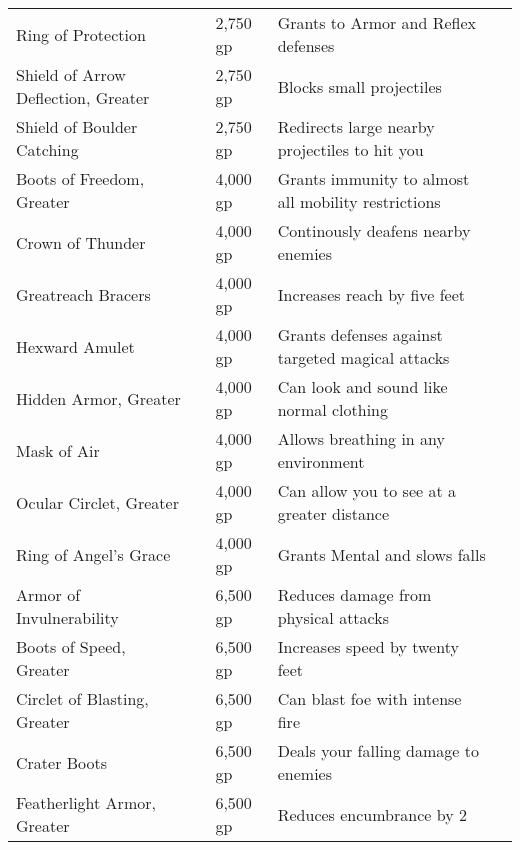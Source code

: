 \begin{longtabuwrapper}
\begin{longtabu}{l l l X l}
Ring of Protection &  & 2,750 gp & Grants  to Armor and Reflex defenses & \pageref{item:Ring of Protection} \\
Shield of Arrow Deflection, Greater &  & 2,750 gp & Blocks small projectiles & \pageref{item:Shield of Arrow Deflection, Greater} \\
Shield of Boulder Catching &  & 2,750 gp & Redirects large nearby projectiles to hit you & \pageref{item:Shield of Boulder Catching} \\
Boots of Freedom, Greater &  & 4,000 gp & Grants immunity to almost all mobility restrictions & \pageref{item:Boots of Freedom, Greater} \\
Crown of Thunder &  & 4,000 gp & Continously deafens nearby enemies & \pageref{item:Crown of Thunder} \\
Greatreach Bracers &  & 4,000 gp & Increases reach by five feet & \pageref{item:Greatreach Bracers} \\
Hexward Amulet &  & 4,000 gp & Grants  defenses against targeted magical attacks & \pageref{item:Hexward Amulet} \\
Hidden Armor, Greater &  & 4,000 gp & Can look and sound like normal clothing & \pageref{item:Hidden Armor, Greater} \\
Mask of Air &  & 4,000 gp & Allows breathing in any environment & \pageref{item:Mask of Air} \\
Ocular Circlet, Greater &  & 4,000 gp & Can allow you to see at a greater distance & \pageref{item:Ocular Circlet, Greater} \\
Ring of Angel's Grace &  & 4,000 gp & Grants  Mental and slows falls & \pageref{item:Ring of Angel's Grace} \\
Armor of Invulnerability &  & 6,500 gp & Reduces damage from physical attacks & \pageref{item:Armor of Invulnerability} \\
Boots of Speed, Greater &  & 6,500 gp & Increases speed by twenty feet & \pageref{item:Boots of Speed, Greater} \\
Circlet of Blasting, Greater &  & 6,500 gp & Can blast foe with intense fire & \pageref{item:Circlet of Blasting, Greater} \\
Crater Boots &  & 6,500 gp & Deals your falling damage to enemies & \pageref{item:Crater Boots} \\
Featherlight Armor, Greater &  & 6,500 gp & Reduces encumbrance by 2 & \pageref{item:Featherlight Armor, Greater} \\

\end{longtabu}
\end{longtabuwrapper}
